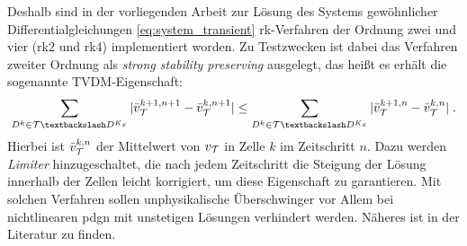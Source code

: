 Deshalb sind in der vorliegenden Arbeit zur Lösung des Systems gewöhnlicher Differentialgleichungen \eqref{eq:system_transient} \ac{rk}-Verfahren der Ordnung zwei und vier (\ac{rk}2 und \ac{rk}4) implementiert worden. Zu Testzwecken ist dabei das Verfahren zweiter Ordnung als \emph{strong stability preserving} ausgelegt, das heißt es erhält die sogenannte TVDM-Eigenschaft:
\begin{equation*}
  \sum_{D^k\in\mathcal{T}\textbackslash D^{K_x}} |\bar{v}\fin^{k+1,n+1} - \bar{v}\fin^{k,n+1}| \leq\sum_{D^k\in\mathcal{T}\textbackslash D^{K_x}} |\bar{v}\fin^{k+1,n} - \bar{v}\fin^{k,n}| \; .
\end{equation*}
Hierbei ist $\bar{v}_{\mathcal{T}}^{k,n}$ der Mittelwert von $v_{\mathcal{T}}$ in Zelle $k$ im Zeitschritt $n$. Dazu werden \emph{Limiter} hinzugeschaltet, die nach jedem Zeitschritt die Steigung der Lösung innerhalb der Zellen leicht korrigiert, um diese Eigenschaft zu garantieren. Mit solchen Verfahren sollen unphysikalische Überschwinger vor Allem bei nichtlinearen \ac{pdg}n mit unstetigen Lösungen verhindert werden. Näheres ist in der Literatur \cite{buch} zu finden.

